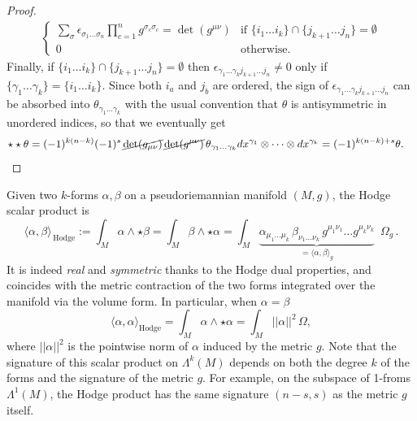 \begin{proof}
{\begin{align}
\begin{cases}
    \sum_\sigma\epsilon_{\sigma_1\dots\sigma_n}\prod_{c=1}^n g^{\sigma_c \sigma_c} = \det(g^{\mu\nu})& \text{if } \{i_1\dots i_k\} \cap \{j_{k+1}\dots j_n\} = \emptyset\\[3pt]
    0 & \text{otherwise}.
\end{cases}
\end{align}}
Finally, if $\{i_1\dots i_k\} \cap \{j_{k+1}\dots j_n\} = \emptyset$ then $\epsilon_{\gamma_1\dots \gamma_k j_{k+1}\dots j_n}\neq0$ only if $\{\gamma_1\dots \gamma_k\} = \{i_1\dots i_k\}$.
Since both $i_a$ and $j_b$ are ordered, the sign of $\epsilon_{\gamma_1\dots \gamma_k j_{k+1}\dots j_n}$ can be absorbed into $\theta_{\gamma_1\dots \gamma_k}$ with the usual convention that $\theta$ is antisymmetric in unordered indices, so that we eventually get
{\small
\begin{align}
\star\star\theta &= (-1)^{k(n-k)}(-1)^s\,\cancel{\det(g_{\mu\nu})}\,\cancel{\det(g^{\mu\nu})}\,\theta_{\gamma_1\dots \gamma_k} dx^{\gamma_1} \otimes \cdots \otimes dx^{\gamma_k} = (-1)^{k(n-k)+s} \theta.
\end{align}}
\end{proof}


\begin{mytheorem}
Given two \(k\)-forms \(\alpha, \beta\) on a pseudoriemannian manifold \((M,g)\), the Hodge scalar product is
\begin{equation}
    \langle \alpha, \beta \rangle_{\,\mathrm{Hodge}} := \int_M \alpha \wedge \star \beta
    = \int_M \beta \wedge \star \alpha 
    = \int_M \underbrace{\alpha_{\mu_1 \dots \mu_k}\, \beta_{\nu_1 \dots \nu_k} \,g^{\mu_1\nu_1} \dots g^{\mu_k \nu_k}}_{=\langle \alpha, \beta \rangle_g} \,\,\, \Omega_g\,.
\end{equation}
It is indeed \emph{real} and \emph{symmetric} thanks to the Hodge dual properties, and coincides with the metric contraction of the two forms integrated over the manifold via the volume form.
In particular, when \(\alpha = \beta\)
\begin{equation}
    \langle \alpha, \alpha \rangle_{\mathrm{Hodge}} = \int_M \alpha \wedge \star \alpha = \int_M ||\alpha||^2 \,\Omega,
\end{equation}
where \(||\alpha||^2\) is the pointwise norm of \(\alpha\) induced by the metric \(g\).
Note that the signature of this scalar product on $\Lambda^k(M)$ depends on both the degree \(k\) of the forms and the signature of the metric \(g\).
For example, on the subspace of 1-froms $\Lambda^1 (M)$, the Hodge product has the same signature $(n-s,s)$ as the metric \(g\) itself.
\end{mytheorem}


